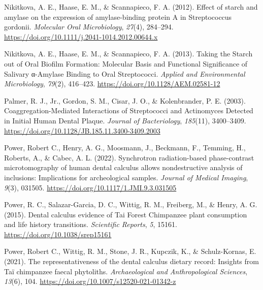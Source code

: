 \documentclass[
  letterpaper,
]{book}
\newlength{\cslhangindent}
\newlength{\cslentryspacingunit} %
\newenvironment{CSLReferences}[2] %
 {%
  \setlength{\parindent}{0pt}
  \ifodd #1
  \let\oldpar\par
  \def\par{\hangindent=\cslhangindent\oldpar}
  \fi
  \setlength{\parskip}{#2\cslentryspacingunit}
 }%
 {}
\begin{document}
\begin{CSLReferences}{1}{0}
\leavevmode{}%
Nikitkova, A. E., Haase, E. M., \& Scannapieco, F. A. (2012). Effect of
starch and amylase on the expression of amylase-binding protein {A} in
{Streptococcus} gordonii. \emph{Molecular Oral Microbiology},
\emph{27}(4), 284--294.
\url{https://doi.org/10.1111/j.2041-1014.2012.00644.x}

\leavevmode{}%
Nikitkova, A. E., Haase, E. M., \& Scannapieco, F. A. (2013). Taking the
{Starch} out of {Oral Biofilm Formation}: {Molecular Basis} and
{Functional Significance} of {Salivary} α-{Amylase Binding} to {Oral
Streptococci}. \emph{Applied and Environmental Microbiology},
\emph{79}(2), 416--423. \url{https://doi.org/10.1128/AEM.02581-12}

\leavevmode{}%
Palmer, R. J., Jr., Gordon, S. M., Cisar, J. O., \& Kolenbrander, P. E.
(2003). Coaggregation-{Mediated Interactions} of {Streptococci} and
{Actinomyces Detected} in {Initial Human Dental Plaque}. \emph{Journal
of Bacteriology}, \emph{185}(11), 3400--3409.
\url{https://doi.org/10.1128/JB.185.11.3400-3409.2003}

\leavevmode{}%
Power, Robert C., Henry, A. G., Moosmann, J., Beckmann, F., Temming, H.,
Roberts, A., \& Cabec, A. L. (2022). Synchrotron radiation-based
phase-contrast microtomography of human dental calculus allows
nondestructive analysis of inclusions: Implications for archeological
samples. \emph{Journal of Medical Imaging}, \emph{9}(3), 031505.
\url{https://doi.org/10.1117/1.JMI.9.3.031505}

\leavevmode{}%
Power, R. C., Salazar-Garcia, D. C., Wittig, R. M., Freiberg, M., \&
Henry, A. G. (2015). Dental calculus evidence of {Tai Forest Chimpanzee}
plant consumption and life history transitions. \emph{Scientific
Reports}, \emph{5}, 15161. \url{https://doi.org/10.1038/srep15161}

\leavevmode{}%
Power, Robert C., Wittig, R. M., Stone, J. R., Kupczik, K., \&
Schulz-Kornas, E. (2021). The representativeness of the dental calculus
dietary record: Insights from {Taï} chimpanzee faecal phytoliths.
\emph{Archaeological and Anthropological Sciences}, \emph{13}(6), 104.
\url{https://doi.org/10.1007/s12520-021-01342-z}


\end{CSLReferences}
\end{document}

